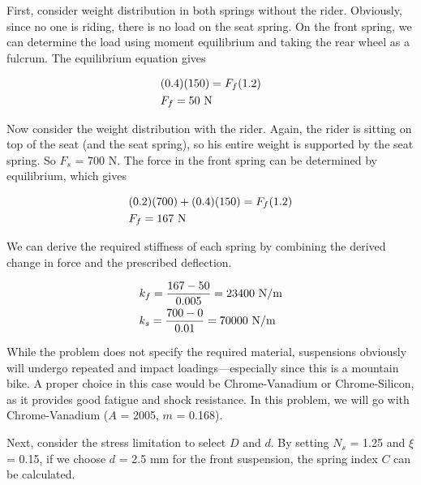\documentclass[
10pt,
a4paper,
openany,
svgnames,
]{book}
\begin{document}
\begin{solution}
  
  First, consider weight distribution in both springs without the rider. Obviously, since no one is riding, there is no load on the seat spring. On the front spring, we can determine the load using moment equilibrium and taking the rear wheel as a fulcrum. The equilibrium equation gives

  \[\begin{gathered}
      (0.4)(150) = F_f(1.2) \hfill \\
      F_f = 50 \text{ N} \hfill \\ 
    \end{gathered} \]

  Now consider the weight distribution with the rider. Again, the rider is sitting on top of the seat (and the seat spring), so his entire weight is supported by the seat spring. So $F_s$ = 700 N. The force in the front spring can be determined by equilibrium, which gives

  \[\begin{gathered}
      (0.2)(700) + (0.4)(150) = F_f(1.2) \hfill \\
      F_f = 167 \text{ N} \hfill \\ 
    \end{gathered} \]

  We can derive the required stiffness of each spring by combining the derived change in force and the prescribed deflection.

  \[\begin{gathered}
      k_f = \frac{167 - 50}{0.005} = 23400 \text{ N/m} \hfill \\
      k_s = \frac{700 - 0}{0.01} = 70000 \text{ N/m} \hfill \\ 
    \end{gathered} \]

  While the problem does not specify the required material, suspensions obviously will undergo repeated and impact loadings—especially since this is a mountain bike. A proper choice in this case would be Chrome-Vanadium or Chrome-Silicon, as it provides good fatigue and shock resistance. In this problem, we will go with Chrome-Vanadium ($A$ = 2005, $m$ = 0.168).
  
  Next, consider the stress limitation to select $D$ and $d$. By setting $N_s$ = 1.25 and $\xi$ = 0.15, if we choose $d$ = 2.5 mm for the front suspension, the spring index $C$ can be calculated.


\end{solution}
\end{document}
